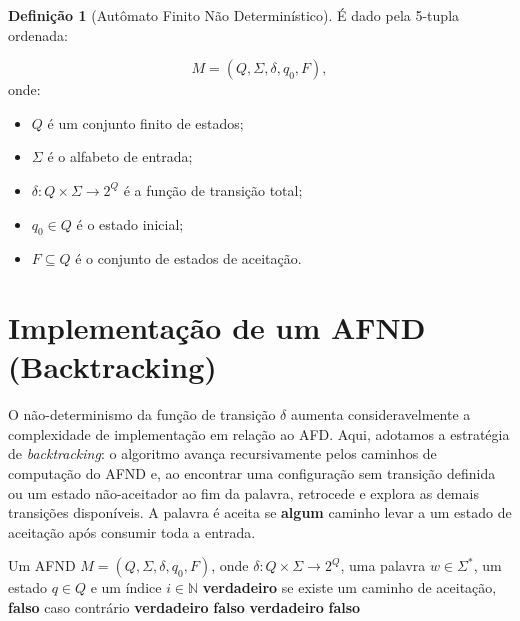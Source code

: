 \documentclass[12pt, a4paper]{article}
\theoremstyle{definition}
\newtheorem{definition}{Definição}[section]
\theoremstyle{plain}
\theoremstyle{remark}
\begin{document}
\begin{definition}[Autômato Finito Não Determinístico]
É dado pela 5-tupla ordenada:

\[
M = (Q, \Sigma, \delta, q_0, F),
\]
onde:

\begin{itemize}
    \item $Q$ é um conjunto finito de estados;
    \item $\Sigma$ é o alfabeto de entrada;
    \item $\delta : Q \times \Sigma \to 2^{Q}$ é a função de transição total;
    \item $q_0 \in Q$ é o estado inicial;
    \item $F \subseteq Q$ é o conjunto de estados de aceitação.
\end{itemize}

\end{definition}

\section{Implementação de um AFND (Backtracking)}
O não-determinismo da função de transição $\delta$ aumenta consideravelmente a complexidade de implementação em relação ao AFD. Aqui, adotamos a estratégia de \textit{backtracking}: o algoritmo avança recursivamente pelos caminhos de computação do AFND e, ao encontrar uma configuração sem transição definida ou um estado não-aceitador ao fim da palavra, retrocede e explora as demais transições disponíveis. A palavra é aceita se \textbf{algum} caminho levar a um estado de aceitação após consumir toda a entrada.

\begin{algorithm}[H]
  \caption{$\textsc{Busca}(M, w, q, i)$}
  \label{alg:afndBusca}
  \begin{algorithmic}[1]
    \Require Um AFND $M = (Q, \Sigma, \delta, q_0, F)$,
             onde $\delta : Q \times \Sigma \to 2^Q$,
             uma palavra $w \in \Sigma^*$,
             um estado $q \in Q$ e um índice $i \in \mathbb{N}$
    \Ensure  \textbf{verdadeiro} se existe um caminho de aceitação, 
             \textbf{falso} caso contrário
        \State \Return \textbf{verdadeiro}
      \Else
        \State \Return \textbf{falso}
      \EndIf
    \EndIf
        \State \Return \textbf{verdadeiro}
      \EndIf
    \EndFor
    \State \Return \textbf{falso}
  \end{algorithmic}
\end{algorithm}
\end{document}

